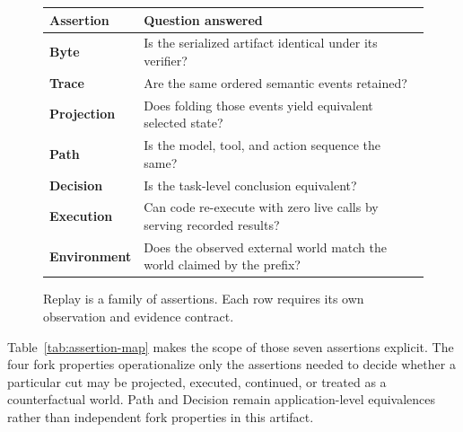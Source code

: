\begin{figure}[ht]
\centering
\small
\begin{tabularx}{0.96\textwidth}{@{}>{\bfseries}p{}Y@{}}
\toprule
Assertion & Question answered \\
\midrule
Byte & Is the serialized artifact identical under its verifier? \\
Trace & Are the same ordered semantic events retained? \\
Projection & Does folding those events yield equivalent selected state? \\
Path & Is the model, tool, and action sequence the same? \\
Decision & Is the task-level conclusion equivalent? \\
Execution & Can code re-execute with zero live calls by serving recorded results? \\
Environment & Does the observed external world match the world claimed by the prefix? \\
\bottomrule
\end{tabularx}
\caption{Replay is a family of assertions.  Each row requires its own
observation and evidence contract.}
\label{fig:replay-family}
\end{figure}

Table~\ref{tab:assertion-map} makes the scope of those seven assertions
explicit.  The four fork properties operationalize only the assertions needed
to decide whether a particular cut may be projected, executed, continued, or
treated as a counterfactual world.  Path and Decision remain application-level
equivalences rather than independent fork properties in this artifact.

